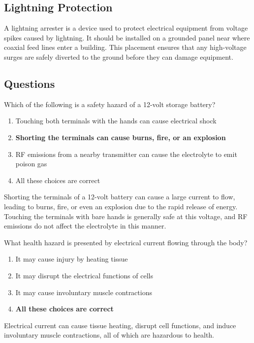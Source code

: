 \subsection*{Lightning Protection}
A lightning arrester is a device used to protect electrical equipment from voltage spikes caused by lightning. It should be installed on a grounded panel near where coaxial feed lines enter a building. This placement ensures that any high-voltage surges are safely diverted to the ground before they can damage equipment.

\subsection*{Questions}
\begin{tcolorbox}[colback=gray!10!white,colframe=black!75!black,title={T0A01}]
    Which of the following is a safety hazard of a 12-volt storage battery?
    \begin{enumerate}[label=\Alph*),noitemsep]
        \item Touching both terminals with the hands can cause electrical shock
        \item \textbf{Shorting the terminals can cause burns, fire, or an explosion}
        \item RF emissions from a nearby transmitter can cause the electrolyte to emit poison gas
        \item All these choices are correct
    \end{enumerate}
\end{tcolorbox}
Shorting the terminals of a 12-volt battery can cause a large current to flow, leading to burns, fire, or even an explosion due to the rapid release of energy. Touching the terminals with bare hands is generally safe at this voltage, and RF emissions do not affect the electrolyte in this manner.


\begin{tcolorbox}[colback=gray!10!white,colframe=black!75!black,title={T0A02}]
    What health hazard is presented by electrical current flowing through the body?
    \begin{enumerate}[label=\Alph*),noitemsep]
        \item It may cause injury by heating tissue
        \item It may disrupt the electrical functions of cells
        \item It may cause involuntary muscle contractions
        \item \textbf{All these choices are correct}
    \end{enumerate}
\end{tcolorbox}
Electrical current can cause tissue heating, disrupt cell functions, and induce involuntary muscle contractions, all of which are hazardous to health.

